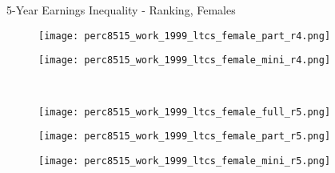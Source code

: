 \documentclass[hyperref={bookmarks=false}]{beamer}
\begin{document}
\begin{appendix}
\begin{frame}{5-Year Earnings Inequality - Ranking, Females}
\begin{figure}[!t]
\begin{minipage}[b]{0.15\textwidth}{}
\centering
\texttt{[image: perc8515\_work\_1999\_ltcs\_female\_part\_r4.png]}
\end{minipage}
\begin{minipage}[b]{0.15\textwidth}{}
\centering
\texttt{[image: perc8515\_work\_1999\_ltcs\_female\_mini\_r4.png]}
\end{minipage}\\
\begin{minipage}[b]{0.15\textwidth}{}
\centering
\texttt{[image: perc8515\_work\_1999\_ltcs\_female\_full\_r5.png]}
\end{minipage}
\begin{minipage}[b]{0.15\textwidth}{}
\centering
\texttt{[image: perc8515\_work\_1999\_ltcs\_female\_part\_r5.png]}
\end{minipage}
\begin{minipage}[b]{0.15\textwidth}{}
\centering
\texttt{[image: perc8515\_work\_1999\_ltcs\_female\_mini\_r5.png]}
\end{minipage}\\
\end{figure}
\end{frame}


\end{appendix}
\end{document}
